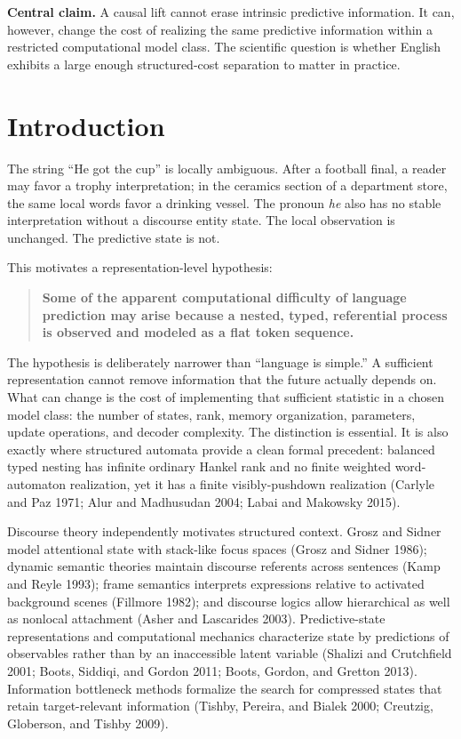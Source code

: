 \documentclass[11pt]{article}
\begin{document}
\begin{centralclaim}
\textbf{Central claim.} A causal lift cannot erase intrinsic predictive information. It can, however, change the cost of realizing the same predictive information within a restricted computational model class. The scientific question is whether English exhibits a large enough structured-cost separation to matter in practice.
\end{centralclaim}

\section{Introduction}\label{introduction}

The string ``He got the cup'' is locally ambiguous. After a football final, a reader may favor a trophy interpretation; in the ceramics section of a department store, the same local words favor a drinking vessel. The pronoun \emph{he} also has no stable interpretation without a discourse entity state. The local observation is unchanged. The predictive state is not.

This motivates a representation-level hypothesis:

\begin{quote}
\textbf{Some of the apparent computational difficulty of language prediction may arise because a nested, typed, referential process is observed and modeled as a flat token sequence.}
\end{quote}

The hypothesis is deliberately narrower than ``language is simple.'' A sufficient representation cannot remove information that the future actually depends on. What can change is the cost of implementing that sufficient statistic in a chosen model class: the number of states, rank, memory organization, parameters, update operations, and decoder complexity. The distinction is essential. It is also exactly where structured automata provide a clean formal precedent: balanced typed nesting has infinite ordinary Hankel rank and no finite weighted word-automaton realization, yet it has a finite visibly-pushdown realization (Carlyle and Paz 1971; Alur and Madhusudan 2004; Labai and Makowsky 2015).

Discourse theory independently motivates structured context. Grosz and Sidner model attentional state with stack-like focus spaces (Grosz and Sidner 1986); dynamic semantic theories maintain discourse referents across sentences (Kamp and Reyle 1993); frame semantics interprets expressions relative to activated background scenes (Fillmore 1982); and discourse logics allow hierarchical as well as nonlocal attachment (Asher and Lascarides 2003). Predictive-state representations and computational mechanics characterize state by predictions of observables rather than by an inaccessible latent variable (Shalizi and Crutchfield 2001; Boots, Siddiqi, and Gordon 2011; Boots, Gordon, and Gretton 2013). Information bottleneck methods formalize the search for compressed states that retain target-relevant information (Tishby, Pereira, and Bialek 2000; Creutzig, Globerson, and Tishby 2009).
\end{document}
